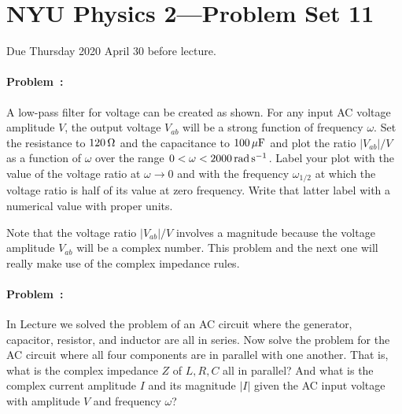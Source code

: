 \documentclass[12pt]{article}
\begin{document}
\section*{NYU Physics 2---Problem Set 11}

Due Thursday 2020 April 30 before lecture.

\paragraph{Problem~\theproblem:}%
A low-pass filter for voltage can be created as shown.
For any input AC voltage amplitude $V$,
the output voltage $V_{ab}$ will be a strong function of frequency $\omega$.
Set the resistance to $120\,\ohm$ and the capacitance to $100\,\muF$
and plot the ratio $|V_{ab}|/V$ as a function of
$\omega$ over the range $0<\omega<2000\,\radps$.
Label your plot with the value of the voltage ratio at $\omega\rightarrow 0$ and
with the frequency $\omega_{1/2}$ at which the voltage ratio is half of its
value at zero frequency. Write that latter label with a numerical value with proper
units.

Note that the voltage ratio $|V_{ab}|/V$ involves a magnitude because the
voltage amplitude $V_{ab}$ will be a complex number. This problem and the
next one will really make use of the complex impedance rules.

\paragraph{Problem~\theproblem:}%
In Lecture we solved the problem of an AC circuit where the generator,
capacitor, resistor, and inductor are all in series.
Now solve the problem for the AC circuit where all four components are
in parallel with one another.
That is, what is the complex impedance $Z$ of $L, R, C$ all in parallel?
And what is the complex current amplitude $I$
and its magnitude $|I|$ given the AC input voltage
with amplitude $V$ and frequency $\omega$?
\end{document}
